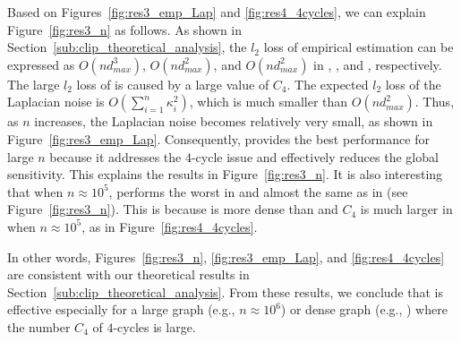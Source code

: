 Based on Figures~\ref{fig:res3_emp_Lap} and \ref{fig:res4_4cycles}, we can explain 
Figure~\ref{fig:res3_n} as follows. 
As shown in Section~\ref{sub:clip_theoretical_analysis}, the $l_2$ loss of empirical estimation can be expressed as 
$O(n d_{max}^3)$, $O(n d_{max}^2)$, and $O(n d_{max}^2)$ 
in \AlgOne{}, \AlgTwo{}, and \AlgThree{}, respectively. 
The large $l_2$ loss of \AlgOne{} is caused by a large value of $C_4$. 
The expected $l_2$ loss of the Laplacian noise is 
$O(\sum_{i=1}^n \kappa_i^2)$, 
which is much smaller than $O(n d_{max}^2)$. 
Thus, 
as $n$ increases, 
the Laplacian noise becomes relatively very small, 
as shown in Figure~\ref{fig:res3_emp_Lap}. 
Consequently, \AlgTwo{} provides the best performance for large $n$ because it addresses the $4$-cycle issue 
and effectively reduces the global sensitivity. 
This explains the results in Figure~\ref{fig:res3_n}. 
It is also interesting that when $n \approx 10^5$, \AlgOne{} performs the worst in \GPlus{} and almost the same as \AlgTwo{} in \IMDB{} (see Figure~\ref{fig:res3_n}). 
This is because \GPlus{} is more dense than \IMDB{} 
and $C_4$ is much larger in \GPlus{} when $n \approx 10^5$, as in Figure~\ref{fig:res4_4cycles}.

In other words, Figures~\ref{fig:res3_n}, \ref{fig:res3_emp_Lap}, and \ref{fig:res4_4cycles} are consistent with our theoretical results in Section~\ref{sub:clip_theoretical_analysis}. 
From these results, we conclude that \AlgTwo{} is effective especially for 
a large graph (e.g., $n \approx 10^6$) or dense graph (e.g., \GPlus{}) where the number $C_4$ of $4$-cycles is large. 




